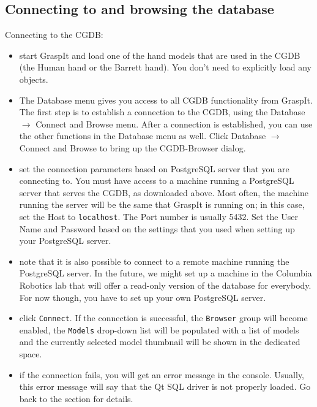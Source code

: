 \subsection{Connecting to and browsing the database}
Connecting to the CGDB:
\begin{itemize}
\item start GraspIt and load one of the hand models that are used in
  the CGDB (the Human hand or the Barrett hand). You don't need to
  explicitly load any objects.
\item The Database menu gives you access to all CGDB functionality
  from GraspIt. The first step is to establish a connection to the
  CGDB, using the Database $\rightarrow$ Connect and Browse
  menu. After a connection is established, you can use the other
  functions in the Database menu as well. Click Database $\rightarrow$
  Connect and Browse to bring up the CGDB-Browser dialog.
\item set the connection parameters based on PostgreSQL server that
  you are connecting to. You must have access to a machine running a
  PostgreSQL server that serves the CGDB, as downloaded above. Most
  often, the machine running the server will be the same that GraspIt
  is running on; in this case, set the Host to \texttt{localhost}. The
  Port number is usually 5432. Set the User Name and Password based on
  the settings that you used when setting up your PostgreSQL server.
\item note that it is also possible to connect to a remote machine
  running the PostgreSQL server. In the future, we might set up a
  machine in the Columbia Robotics lab that will offer a read-only
  version of the database for everybody. For now though, you have to
  set up your own PostgreSQL server.
\item click \texttt{Connect}. If the connection is successful, the
  \texttt{Browser} group will become enabled, the \texttt{Models}
  drop-down list will be populated with a list of models and the
  currently selected model thumbnail will be shown in the dedicated
  space.
\item if the connection fails, you will get an error message in the
  console. Usually, this error message will say that the Qt SQL driver
  is not properly loaded. Go back to the  section for details.
\end{itemize}

